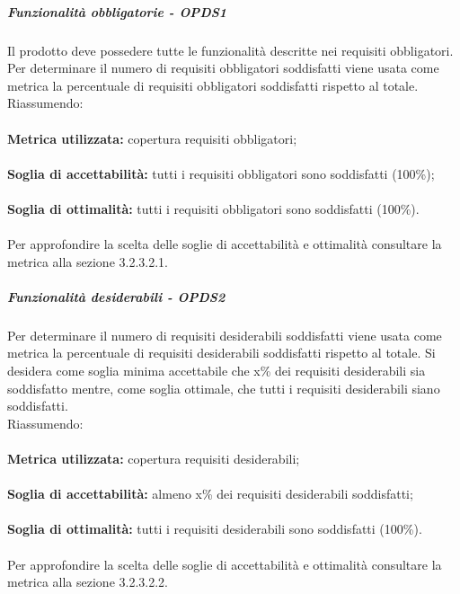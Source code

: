 \documentclass[PianoDiQualifica.tex]{subfiles}
\begin{document}
				\subparagraph{Funzionalità obbligatorie - OPDS1}
				Il prodotto deve possedere tutte le funzionalità descritte nei requisiti obbligatori. Per determinare il numero di requisiti obbligatori soddisfatti viene usata 
				come metrica la percentuale di requisiti obbligatori soddisfatti rispetto al totale. \\
				Riassumendo: \\ \\
				\textbf{Metrica utilizzata:} copertura requisiti obbligatori;\\ \\
				\textbf{Soglia di accettabilità:} tutti i requisiti obbligatori sono soddisfatti (100\%); \\ \\
				\textbf{Soglia di ottimalità:} tutti i requisiti obbligatori sono soddisfatti (100\%). \\ \\
				Per approfondire la scelta delle soglie di accettabilità e ottimalità consultare la metrica alla sezione 3.2.3.2.1.
				
				\subparagraph{Funzionalità desiderabili - OPDS2}
				Per determinare il numero di requisiti desiderabili soddisfatti viene usata come metrica la percentuale di requisiti desiderabili soddisfatti rispetto al totale.
				Si desidera come soglia minima accettabile che x\% dei requisiti desiderabili sia soddisfatto mentre, come soglia ottimale, che tutti i requisiti desiderabili siano soddisfatti. \\
				Riassumendo: \\ \\
				\textbf{Metrica utilizzata:} copertura requisiti desiderabili;\\ \\
				\textbf{Soglia di accettabilità:} almeno x\% dei requisiti desiderabili soddisfatti; \\ \\
				\textbf{Soglia di ottimalità:} tutti i requisiti desiderabili sono soddisfatti (100\%). \\ \\
				Per approfondire la scelta delle soglie di accettabilità e ottimalità consultare la metrica alla sezione 3.2.3.2.2.
				
\end{document}
